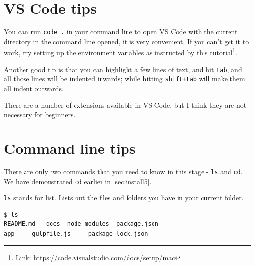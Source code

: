 \section{VS Code tips}

You can run \texttt{code .} in your command line to open VS Code with the current directory in the command line opened, it is very convenient. If you can't get it to work, try setting up the environment variables as instructed \href{https://code.visualstudio.com/docs/setup/mac}{by this tutorial}\footnote{Link: \url{https://code.visualstudio.com/docs/setup/mac}}.
\vspace{6mm}

Another good tip is that you can highlight a few lines of text, and hit \texttt{tab}, and all those lines will be indented inwards; while hitting \texttt{shift+tab} will make them all indent outwards.
\vspace{6mm}

There are a number of extensions available in VS Code, but I think they are not necessary for beginners.

\section{Command line tips}

There are only two commands that you need to know in this stage - \texttt{ls} and \texttt{cd}. We have demonstrated \texttt{cd} earlier in \cref{sec:install5}.
\vspace{6mm}

\texttt{ls} stands for list. Lists out the files and folders you have in your current folder.
\vspace{6mm}

\begin{lstlisting}[language=bash]
$ ls
README.md   docs  node_modules  package.json    
app     gulpfile.js     package-lock.json
\end{lstlisting}
